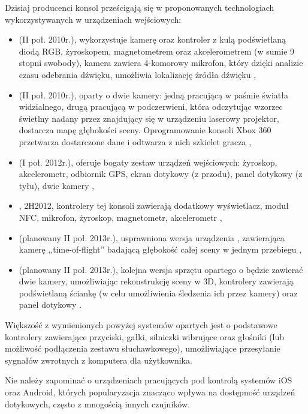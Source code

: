 Dzisiaj producenci konsol prześcigają się w proponowanych technologiach wykorzystywanych w urządzeniach wejściowych:
\begin{itemize}
 \item {} (II poł. 2010r.), wykorzystuje kamerę oraz kontroler z kulą podświetlaną diodą RGB, żyroskopem, magnetometrem oraz akcelerometrem (w sumie 9 stopni swobody), kamera zawiera 4-komorowy mikrofon, który dzięki analizie czasu odebrania dźwięku, umożliwia lokalizację źródła dźwięku \cite{psmove},
 \item {} (II poł. 2010r.), oparty o dwie kamery: jedną pracującą w paśmie światła widzialnego, drugą pracującą w podczerwieni, która odczytując wzorzec świetlny nadany przez znajdujący się w urządzeniu laserowy projektor, dostarcza mapę głębokości sceny. Oprogramowanie konsoli Xbox 360 przetwarza dostarczone dane i odtwarza z nich szkielet gracza \cite{kinect},
 \item {} (I poł. 2012r.), oferuje bogaty zestaw urządzeń wejściowych: żyroskop, akcelerometr, odbiornik GPS, ekran dotykowy (z przodu), panel dotykowy (z tyłu), dwie kamery \cite{vita},
 \item {}, 2H2012, kontrolery tej konsoli zawierają dodatkowy wyświetlacz, moduł NFC, mikrofon, żyroskop, magnetometr, akcelerometr \cite{wiiu},
 \item {} (planowany II poł. 2013r.), usprawniona wersja urządzenia , zawierająca kamerę ,,time-of-flight'' badającą głębokość całej sceny w jednym przebiegu \cite{xbone},
 \item {} (planowany II poł. 2013r.), kolejna wersja sprzętu opartego o  będzie zawierać dwie kamery, umożliwiając rekonstrukcję sceny w 3D, kontrolery zawierają  podświetlaną ściankę (w celu umożliwienia śledzenia ich przez kamery) oraz panel dotykowy \cite{psfour}.
\end{itemize}

Większość z wymienionych powyżej systemów opartych jest o podstawowe kontrolery zawierające przyciski, gałki, silniczki wibrujące oraz głośniki (lub możliwość podłączenia zestawu słuchawkowego), umożliwiające przesyłanie sygnałów zwrotnych z komputera dla użytkownika.

Nie należy zapominać o urządzeniach pracujących pod kontrolą systemów iOS oraz Android, których popularyzacja znacząco wpływa na dostępność urządzeń dotykowych, często z mnogością innych czujników.\\

